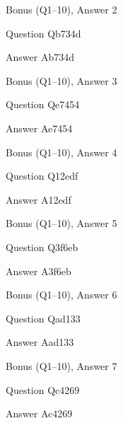 \documentclass[11pt]{beamer}
\begin{document}
\begin{frame}[t]{Bonus (Q1--10), Answer 2}
\vspace{2em}
\begin{block}{Question}
Qb734d
\end{block}
\pause{}
\begin{block}{Answer}
Ab734d
\end{block}
\end{frame}
    

\begin{frame}[t]{Bonus (Q1--10), Answer 3}
\vspace{2em}
\begin{block}{Question}
Qe7454
\end{block}
\pause{}
\begin{block}{Answer}
Ae7454
\end{block}
\end{frame}
    

\begin{frame}[t]{Bonus (Q1--10), Answer 4}
\vspace{2em}
\begin{block}{Question}
Q12edf
\end{block}
\pause{}
\begin{block}{Answer}
A12edf
\end{block}
\end{frame}
    

\begin{frame}[t]{Bonus (Q1--10), Answer 5}
\vspace{2em}
\begin{block}{Question}
Q3f6eb
\end{block}
\pause{}
\begin{block}{Answer}
A3f6eb
\end{block}
\end{frame}
    

\begin{frame}[t]{Bonus (Q1--10), Answer 6}
\vspace{2em}
\begin{block}{Question}
Qad133
\end{block}
\pause{}
\begin{block}{Answer}
Aad133
\end{block}
\end{frame}
    

\begin{frame}[t]{Bonus (Q1--10), Answer 7}
\vspace{2em}
\begin{block}{Question}
Qc4269
\end{block}
\pause{}
\begin{block}{Answer}
Ac4269
\end{block}
\end{frame}
    
\end{document}
